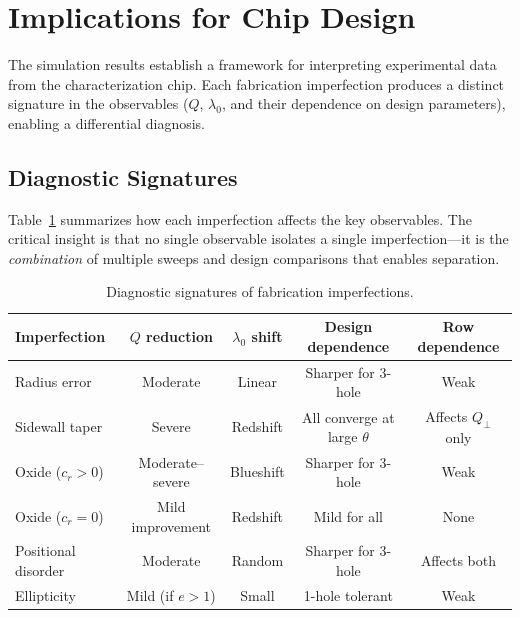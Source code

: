 \documentclass[11pt,a4paper]{article}
\begin{document}
\section{Implications for Chip Design}
\label{sec:chip}

The simulation results establish a framework for interpreting experimental data from the characterization chip. Each fabrication imperfection produces a distinct signature in the observables ($Q$, $\lambda_0$, and their dependence on design parameters), enabling a differential diagnosis.

\subsection{Diagnostic Signatures}
\label{sec:signatures}

Table~\ref{tab:signatures} summarizes how each imperfection affects the key observables. The critical insight is that no single observable isolates a single imperfection---it is the \emph{combination} of multiple sweeps and design comparisons that enables separation.

\begin{table}[htbp]
  \centering
  \caption{Diagnostic signatures of fabrication imperfections.}
  \label{tab:signatures}
  \begin{tabular}{@{}lcccc@{}}
    \toprule
    Imperfection & $Q$ reduction & $\lambda_0$ shift & Design dependence & Row dependence \\
    \midrule
    Radius error & Moderate & Linear & Sharper for 3-hole & Weak \\
    Sidewall taper & Severe & Redshift & All converge at large $\theta$ & Affects $Q_\perp$ only \\
    Oxide ($c_r > 0$) & Moderate--severe & Blueshift & Sharper for 3-hole & Weak \\
    Oxide ($c_r = 0$) & Mild improvement & Redshift & Mild for all & None \\
    Positional disorder & Moderate & Random & Sharper for 3-hole & Affects both \\
    Ellipticity & Mild (if $e > 1$) & Small & 1-hole tolerant & Weak \\
    \bottomrule
  \end{tabular}
\end{table}
\end{document}
